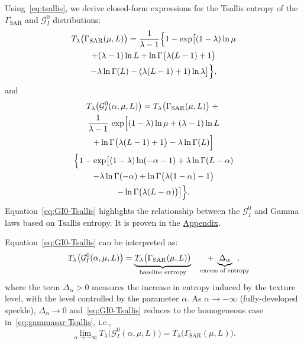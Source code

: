 \documentclass[
  lettersize  journal,
]{IEEEtran}%
\begin{document}
Using~\eqref{eq:tsallis}, we derive closed-form expressions for the
Tsallis entropy of the \(\Gamma_{\mathrm{SAR}}\) and \(\mathcal{G}^0_I\)
distributions: \begin{multline}
\label{eq:gammasar-Tsallis}
T_\lambda\bigl(\Gamma_{\mathrm{SAR}}(\mu, L)\bigr)=
\frac{1}{\lambda-1}\Bigl\{1-
\exp\bigl[
(1-\lambda)\ln\mu\\
+(\lambda-1)\ln L
+\ln\Gamma\bigl(\lambda(L-1)+1\bigr) \\
-\lambda\ln\Gamma(L)
-(\lambda(L-1)+1)\ln\lambda
\bigr]\Bigr\}, 
\end{multline} and \begin{multline}
\label{eq:GI0-Tsallis}
  T_\lambda\bigl(\mathcal{G}^0_I(\alpha, \mu, L)\bigr) = T_\lambda\bigl(\Gamma_{\mathrm{SAR}}(\mu, L)\bigr)\;+\;\\
  \frac{1}{\lambda-1}\,
  \exp\Bigl[
  (1-\lambda)\ln\mu
  +(\lambda-1)\ln L\\
  +\ln\Gamma\bigl(\lambda(L-1)+1\bigr)
  -\lambda\ln\Gamma(L)
  \Bigr] \\
  {}\Bigl\{1-
  \exp\bigl[
  (1-\lambda)\ln(-\alpha-1)
  +\lambda\ln\Gamma(L-\alpha)\\
  -\lambda\ln\Gamma(-\alpha) 
  +\ln\Gamma\bigl(\lambda(1-\alpha)-1\bigr)\\
  -\ln\Gamma\bigl(\lambda(L-\alpha)\bigr)
  \bigr]\Bigr\}.
\end{multline} Equation~\eqref{eq:GI0-Tsallis} highlights the
relationship between the \(\mathcal{G}^0_I\) and Gamma laws based on
Tsallis entropy. It is proven in the \href{}{Appendix}.

Equation~\eqref{eq:GI0-Tsallis} can be interpreted as: \begin{equation*}
  T_\lambda\bigl(\mathcal{G}^0_I(\alpha, \mu, L)\bigr)
  =
  \underbrace{T_\lambda \bigl(\Gamma_{\mathrm{SAR}}(\mu, L)\bigr)}_{\text{baseline entropy}}
  \hspace{1.8em} + \hspace{-1.8em}
  \underbrace{\Delta_\alpha}_{\text{excess of entropy}}\hspace{-1.5em},
\end{equation*} where the term \(\Delta_\alpha>0\) measures the increase
in entropy induced by the texture level, with the level controlled by
the parameter \(\alpha\). As \(\alpha \to -\infty\) (fully-developed
speckle), \(\Delta_\alpha \to 0\) and~\eqref{eq:GI0-Tsallis} reduces to
the homogeneous case in~\eqref{eq:gammasar-Tsallis}, i.e., \[
\lim_{\alpha \to -\infty} T_{\lambda}\bigl(\mathcal{G}^0_I(\alpha, \mu, L)\bigr) =  T_{\lambda}\bigl(\Gamma_{\mathrm{SAR}}(\mu, L)\bigr).
\]
\end{document}
